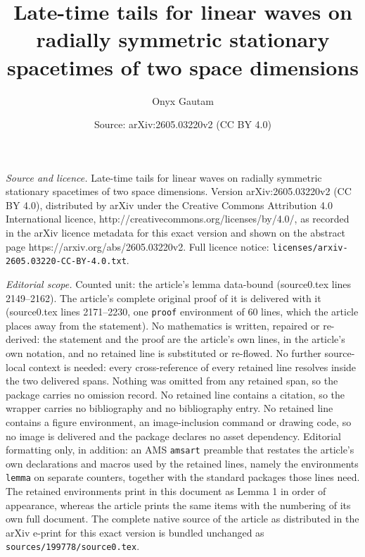 \documentclass[10pt,a4paper]{amsart}
\title{Late-time tails for linear waves on radially symmetric stationary spacetimes of two space dimensions}
\author{Onyx Gautam}
\date{Source: arXiv:2605.03220v2 (CC BY 4.0)}
\begin{document}
\maketitle

\noindent\emph{Source and licence.} Late-time tails for linear waves on radially symmetric stationary spacetimes of two space dimensions. Version arXiv:2605.03220v2 (CC BY 4.0), distributed by arXiv under the Creative Commons Attribution 4.0 International licence, http://creativecommons.org/licenses/by/4.0/, as recorded in the arXiv licence metadata for this exact version and shown on the abstract page https://arxiv.org/abs/2605.03220v2. Full licence notice: \texttt{licenses/arxiv-2605.03220-CC-BY-4.0.txt}.\par\smallskip

\noindent\textit{Editorial scope.} Counted unit: the article's lemma data-bound (source0.tex lines 2149--2162). The article's complete original proof of it is delivered with it (source0.tex lines 2171--2230, one \texttt{proof} environment of 60 lines, which the article places away from the statement). No mathematics is written, repaired or re-derived: the statement and the proof are the article's own lines, in the article's own notation, and no retained line is substituted or re-flowed.  No further source-local context is needed: every cross-reference of every retained line resolves inside the two delivered spans.  Nothing was omitted from any retained span, so the package carries no omission record.  No retained line contains a citation, so the wrapper carries no bibliography and no bibliography entry.  No retained line contains a figure environment, an image-inclusion command or drawing code, so no image is delivered and the package declares no asset dependency.  Editorial formatting only, in addition: an AMS \texttt{amsart} preamble that restates the article's own declarations and macros used by the retained lines, namely the environments \texttt{lemma} on separate counters, together with the standard packages those lines need.  The retained environments print in this document as Lemma 1 in order of appearance, whereas the article prints the same items with the numbering of its own full document.  The complete native source of the article as distributed in the arXiv e-print for this exact version is bundled unchanged as \texttt{sources/199778/source0.tex}.
\end{document}
